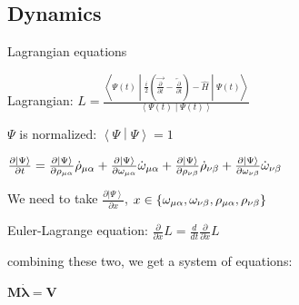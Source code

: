 \documentclass[professionalfonts]{beamer}
\newcommand{\ket}[1]{\ensuremath{\left|#1\right\rangle}}
\newcommand{\braket}[2]{\left< #1 \middle\vert #2 \right>}
\newcommand{\sandwich}[3]{\left< #1 \middle\vert #2 \middle\vert #3 \right>}
\newcommand{\ddt}{\frac{d}{dt}}
\newcommand{\pd}[1]{\frac{\partial}{\partial #1}}
\newcommand{\kpp}[1]{\frac{\partial \ket\Psi}{\partial #1}}
\newcommand{\ind}[1]{{\uo #1 \oo #1}}
\newcommand{\uo}[1]{
		\IfEqCase{#1}{
			{0}{\mu}
			{1}{\nu}
			{2}{\xi}
		}[\PackageError{uo}{Undefined option to uo: #1}{}]
}
\newcommand{\oo}[1]{
		\IfEqCase{#1}{
			{0}{\alpha}
			{1}{\beta}
			{2}{\gamma}
		}[\PackageError{unocorb}{Undefined option to unuo: #1}{}]
}
\newcommand{\SubItem}[1]{
    {\setlength\itemindent{15pt} \item[*] #1}
}
\begin{document}

\subsection {\textbf{Dynamics}}

\begin{frame}{Lagrangian equations}
	\begin{itemize}
		\item Lagrangian:
		\(
	L = \frac{\sandwich{\Psi(t)}{\frac{i}{2}\left(\overrightarrow{\pd t} - \overleftarrow{\pd t}\right) - \hat H}{\Psi(t)}}{\braket{\Psi(t)}{\Psi(t)}}
			\)
			\SubItem{$\Psi$ is normalized: $\braket \Psi \Psi = 1$}
			\SubItem{\(
				{\kpp t} = \kpp {\rho_\ind 0 }\dot \rho_\ind 0
	+	\kpp {\omega_\ind 0}\dot \omega_\ind 0
	+	\kpp {\rho_\ind 1 }\dot \rho_\ind 1
	+	\kpp {\omega_\ind 1}\dot \omega_\ind 1
			\)}
			\SubItem{We need to take $\kpp{x}$, $x \in \{\omega_\ind 0, \omega_\ind 1, \rho_\ind 0, \rho_\ind 1\}$}
		\item Euler-Lagrange equation:
		\(
				\pd{x} L = \ddt \pd{\dot x} L
			\)
		\item combining these two, we get a system of equations:
		\SubItem{\(
			\bm M \dot{\bm \lambda} = \bm V
		\)}
	\end{itemize}
\end{frame}
\end{document}
